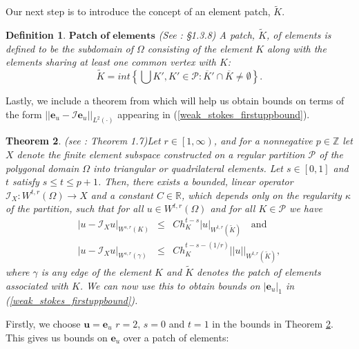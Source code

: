 \documentclass[12pt,a4paper]{article}
\newtheorem{theorem}{Theorem}[section]
\newtheorem{definition}[theorem]{Definition}
\theoremstyle{definition}
\begin{document}
Our next step is to introduce the concept of an element patch, $\widetilde{K}$.
\begin{definition}{$\textbf{Patch of elements}$} (See \cite{ainsworth2011posteriori}: \S 1.3.8)
	A patch, $\widetilde{K}$, of elements is defined to be the subdomain of $\Omega$ consisting of the element $K$ along with the elements sharing at least one common vertex with $K$:
	\begin{equation}
		\widetilde{K}=int\left\{\bigcup K', K' \in \mathcal{P}: \overline{K}'\cap\overline{K}\neq \emptyset \right\}.\nonumber
	\end{equation}
\end{definition}
Lastly, we include a theorem from \cite{ainsworth2011posteriori} which will help us obtain bounds on terms of the form $\left|\left|\textbf{e}_u-\mathcal{I}\textbf{e}_u\right|\right|_{L^2\left(\cdot\right)}$ appearing in (\ref{weak_stokes_firstuppbound}).
\begin{theorem}{(see \cite{ainsworth2011posteriori}: Theorem 1.7)}\label{theorem_twobounds}
	Let $r\in\left[1,\infty\right)$, and for a nonnegative $p\in\mathbb{Z}$ let $X$ denote the finite element subspace constructed on a regular partition $\mathcal{P}$ of the polygonal domain $\Omega$ into triangular or quadrilateral elements.  Let $s\in \left[0,1\right]$ and $t$ satisfy $s\leq t\leq p+1$. Then, there exists a bounded, linear operator $\mathcal{I}_X\colon W^{t,r}\left(\Omega\right)\rightarrow X$ and a constant $C\in \mathbb{R}$, which depends only on the regularity $\kappa$ of the partition, such that for all $u\in W^{t,r}\left(\Omega\right)$ and for all $K\in \mathcal{P}$ we have
	\begin{eqnarray}
		\left|u-\mathcal{I}_Xu\right|_{W^{s,r}\left(K\right)} &\leq & Ch_K^{t-s}\left|u\right|_{W^{t,r}\left(\widetilde{K}\right)}\quad\text{and}\nonumber\\
				\left|u-\mathcal{I}_Xu\right|_{W^{s,r}\left(\gamma\right)} &\leq &Ch_K^{t-s-\left(1/r\right)}\left|\left|u\right|\right|_{W^{t,r}\left(\widetilde{K}\right)},\nonumber
	\end{eqnarray}
	where $\gamma$ is any edge of the element $K$ and $\widetilde{K}$ denotes the patch of elements associated with $K$.  We can now use this to obtain bounds on $\left|\textbf{e}_u\right|_1$ in (\ref{weak_stokes_firstuppbound}).
\end{theorem}
Firstly, we choose  $\textbf{u}=\textbf{e}_u$ $r=2$, $s=0$ and $t=1$ in the bounds in Theorem \ref{theorem_twobounds}.  This gives us bounds on $\textbf{e}_u$ over a patch of elements:
\end{document}
